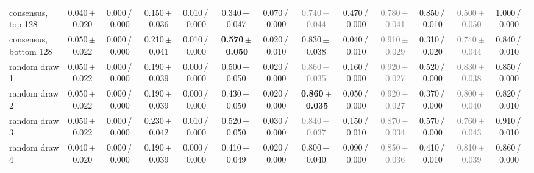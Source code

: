 \begin{tabular}{@{}lcccccccccccc@{}}
consensus, top 128 & 0.040\,{\scriptsize$\pm$\,0.020} & {\scriptsize 0.000\,/\,0.000} & 0.150\,{\scriptsize$\pm$\,0.036} & {\scriptsize 0.010\,/\,0.000} & 0.340\,{\scriptsize$\pm$\,0.047} & {\scriptsize 0.070\,/\,0.000} & \textcolor{gray}{0.740\,{\scriptsize$\pm$\,0.044}} & {\scriptsize 0.470\,/\,0.000} & \textcolor{gray}{0.780\,{\scriptsize$\pm$\,0.041}} & {\scriptsize 0.850\,/\,0.010} & \textcolor{gray}{0.500\,{\scriptsize$\pm$\,0.050}} & {\scriptsize 1.000\,/\,0.000} \\
consensus, bottom 128 & 0.050\,{\scriptsize$\pm$\,0.022} & {\scriptsize 0.000\,/\,0.000} & 0.210\,{\scriptsize$\pm$\,0.041} & {\scriptsize 0.010\,/\,0.000} & \textbf{0.570\,{\scriptsize$\pm$\,0.050}} & {\scriptsize 0.020\,/\,0.010} & 0.830\,{\scriptsize$\pm$\,0.038} & {\scriptsize 0.040\,/\,0.010} & \textcolor{gray}{0.910\,{\scriptsize$\pm$\,0.029}} & {\scriptsize 0.310\,/\,0.020} & \textcolor{gray}{0.740\,{\scriptsize$\pm$\,0.044}} & {\scriptsize 0.840\,/\,0.010} \\
\midrule
random draw 1 & 0.050\,{\scriptsize$\pm$\,0.022} & {\scriptsize 0.000\,/\,0.000} & 0.190\,{\scriptsize$\pm$\,0.039} & {\scriptsize 0.000\,/\,0.000} & 0.500\,{\scriptsize$\pm$\,0.050} & {\scriptsize 0.020\,/\,0.000} & \textcolor{gray}{0.860\,{\scriptsize$\pm$\,0.035}} & {\scriptsize 0.160\,/\,0.000} & \textcolor{gray}{0.920\,{\scriptsize$\pm$\,0.027}} & {\scriptsize 0.520\,/\,0.000} & \textcolor{gray}{0.830\,{\scriptsize$\pm$\,0.038}} & {\scriptsize 0.850\,/\,0.000} \\
random draw 2 & 0.050\,{\scriptsize$\pm$\,0.022} & {\scriptsize 0.000\,/\,0.000} & 0.190\,{\scriptsize$\pm$\,0.039} & {\scriptsize 0.000\,/\,0.000} & 0.430\,{\scriptsize$\pm$\,0.050} & {\scriptsize 0.020\,/\,0.000} & \textbf{0.860\,{\scriptsize$\pm$\,0.035}} & {\scriptsize 0.050\,/\,0.000} & \textcolor{gray}{0.920\,{\scriptsize$\pm$\,0.027}} & {\scriptsize 0.370\,/\,0.000} & \textcolor{gray}{0.800\,{\scriptsize$\pm$\,0.040}} & {\scriptsize 0.820\,/\,0.010} \\
random draw 3 & 0.050\,{\scriptsize$\pm$\,0.022} & {\scriptsize 0.000\,/\,0.000} & 0.230\,{\scriptsize$\pm$\,0.042} & {\scriptsize 0.010\,/\,0.000} & 0.520\,{\scriptsize$\pm$\,0.050} & {\scriptsize 0.030\,/\,0.000} & \textcolor{gray}{0.840\,{\scriptsize$\pm$\,0.037}} & {\scriptsize 0.150\,/\,0.010} & \textcolor{gray}{0.870\,{\scriptsize$\pm$\,0.034}} & {\scriptsize 0.570\,/\,0.000} & \textcolor{gray}{0.760\,{\scriptsize$\pm$\,0.043}} & {\scriptsize 0.910\,/\,0.010} \\
random draw 4 & 0.040\,{\scriptsize$\pm$\,0.020} & {\scriptsize 0.000\,/\,0.000} & 0.190\,{\scriptsize$\pm$\,0.039} & {\scriptsize 0.000\,/\,0.000} & 0.410\,{\scriptsize$\pm$\,0.049} & {\scriptsize 0.020\,/\,0.000} & 0.800\,{\scriptsize$\pm$\,0.040} & {\scriptsize 0.090\,/\,0.000} & \textcolor{gray}{0.850\,{\scriptsize$\pm$\,0.036}} & {\scriptsize 0.410\,/\,0.010} & \textcolor{gray}{0.810\,{\scriptsize$\pm$\,0.039}} & {\scriptsize 0.860\,/\,0.000} \\

\end{tabular}
